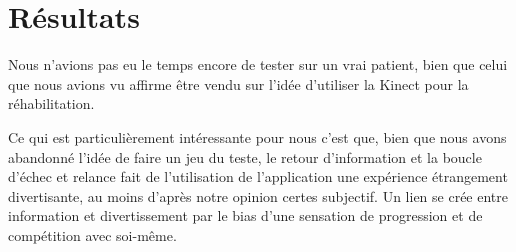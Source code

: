 \section{Résultats}\label{resultats}
Nous n'avions pas eu le temps encore de tester sur un vrai patient, bien que 
celui que nous avions vu affirme être vendu sur l'idée d'utiliser la Kinect pour
la réhabilitation.

Ce qui est particulièrement intéressante pour nous c'est que, bien que nous avons
abandonné l'idée de faire un jeu du teste, le retour d'information et la boucle
d'échec et relance fait de l'utilisation de l'application une expérience 
étrangement divertisante, au moins d'après notre opinion certes subjectif. 
Un lien se crée entre information et divertissement 
par le bias d'une sensation de progression et de compétition avec soi-même.